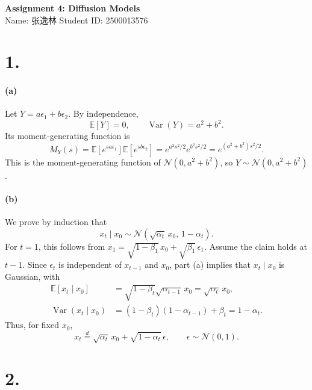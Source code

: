 \documentclass[11pt,a4paper]{article}
\newcommand{\E}{\mathbb{E}}
\DeclareMathOperator{\Var}{Var}
\newcommand{\N}{\mathcal{N}}
\begin{document}
\begin{center}
  {\Large\bfseries Assignment 4: Diffusion Models}\\[8pt]
  Name: 张逸林
  \hspace{8mm}
  Student ID: 2500013576
\end{center}

\section*{1.}

\paragraph{(a)}
Let \(Y=a\epsilon_1+b\epsilon_2\). By independence,
\[
\E[Y]=0,\qquad \Var(Y)=a^2+b^2.
\]
Its moment-generating function is
\[
M_Y(s)=\E[e^{sa\epsilon_1}]\E[e^{sb\epsilon_2}]
=e^{a^2s^2/2}e^{b^2s^2/2}
=e^{(a^2+b^2)s^2/2}.
\]
This is the moment-generating function of \(\N(0,a^2+b^2)\), so
\(Y\sim\N(0,a^2+b^2)\).

\paragraph{(b)}
We prove by induction that
\[
x_t\mid x_0\sim\N\!\left(\sqrt{\alpha_t}\,x_0,\,1-\alpha_t\right).
\]
For \(t=1\), this follows from
\(x_1=\sqrt{1-\beta_1}\,x_0+\sqrt{\beta_1}\,\epsilon_1\).
Assume the claim holds at \(t-1\). Since \(\epsilon_t\) is independent
of \(x_{t-1}\) and \(x_0\), part (a) implies that \(x_t\mid x_0\) is
Gaussian, with
\[
\begin{aligned}
\E[x_t\mid x_0]
&=\sqrt{1-\beta_t}\sqrt{\alpha_{t-1}}\,x_0
=\sqrt{\alpha_t}\,x_0,\\
\Var(x_t\mid x_0)
&=(1-\beta_t)(1-\alpha_{t-1})+\beta_t
=1-\alpha_t.
\end{aligned}
\]
Thus, for fixed \(x_0\),
\[
\boxed{x_t\overset{d}{=}\sqrt{\alpha_t}\,x_0+\sqrt{1-\alpha_t}\,\epsilon,
\qquad \epsilon\sim\N(0,1).}
\]

\section*{2.}
\end{document}
